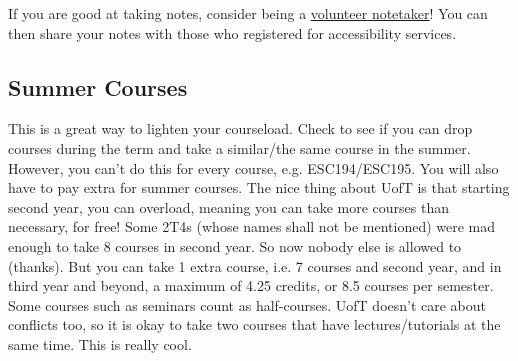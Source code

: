 If you are good at taking notes, consider being a \href{https://studentlife.utoronto.ca/program/volunteer-note-taking/}{volunteer notetaker}! You can then share your notes with those who registered for accessibility services.

\subsection{Summer Courses}

This is a great way to lighten your courseload. Check to see if you can drop courses during the term and take a similar/the same course in the summer. However, you can't do this for every course, e.g. ESC194/ESC195. You will also have to pay extra for summer courses. The nice thing about UofT is that starting second year, you can overload, meaning you can take more courses than necessary, for free! Some 2T4s (whose names shall not be mentioned) were mad enough to take 8 courses in second year. So now nobody else is allowed to (thanks). But you can take 1 extra course, i.e. 7 courses and second year, and in third year and beyond, a maximum of 4.25 credits, or 8.5 courses per semester. Some courses such as seminars count as half-courses. UofT doesn't care about conflicts too, so it is okay to take two courses that have lectures/tutorials at the same time. This is really cool.

